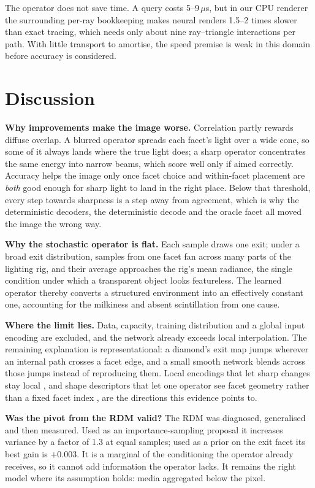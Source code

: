 \documentclass[conference]{IEEEtran}
\begin{document}
The operator does not save time. A query costs 5--9\,$\mu$s, but in our
CPU renderer the surrounding per-ray bookkeeping makes neural renders 1.5--2
times slower than exact tracing, which needs only about nine ray--triangle
interactions per path. With little transport to amortise, the speed premise is
weak in this domain before accuracy is considered.

\section{Discussion}

\textbf{Why improvements make the image worse.} Correlation partly rewards
diffuse overlap. A blurred operator spreads each facet's light over a wide cone,
so some of it always lands where the true light does; a sharp operator
concentrates the same energy into narrow beams, which score well only if aimed
correctly. Accuracy helps the image only once facet choice and within-facet
placement are \emph{both} good enough for sharp light to land in the right place.
Below that threshold, every step towards sharpness is a step away from agreement,
which is why the deterministic decoders, the deterministic decode and the oracle
facet all moved the image the wrong way.

\textbf{Why the stochastic operator is flat.} Each sample draws one exit; under
a broad exit distribution, samples from one facet fan across many parts of the
lighting rig, and their average approaches the rig's mean radiance, the single
condition under which a transparent object looks featureless. The learned
operator thereby converts a structured environment into an effectively constant
one, accounting for the milkiness and absent scintillation from one cause.

\textbf{Where the limit lies.} Data, capacity, training distribution and a global
input encoding are excluded, and the network already exceeds local
interpolation. The remaining explanation is representational: a diamond's exit
map jumps wherever an internal path crosses a facet edge, and a small smooth
network blends across those jumps instead of reproducing them. Local
encodings that let sharp changes stay local \cite{muller2022ngp}, and shape
descriptors that let one operator see facet geometry rather than a fixed facet
index \cite{vicini2019}, are the directions this evidence points to.

\textbf{Was the pivot from the RDM valid?} The RDM was diagnosed, generalised
and then measured. Used as an importance-sampling proposal it increases variance
by a factor of 1.3 at equal samples; used as a prior on the exit facet its best
gain is $+0.003$. It is a marginal of the conditioning the operator already
receives, so it cannot add information the operator lacks. It remains the right
model where its assumption holds: media aggregated below the pixel.
\end{document}
